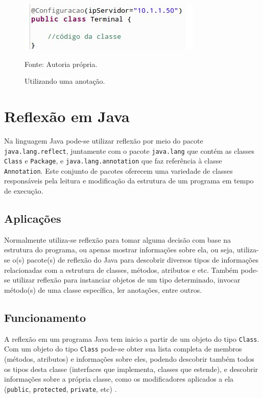 \documentclass[tc,oneside]{iiufrgs}
\begin{document}
\begin{figure}[ht]
	\centering
	\includegraphics[scale=0.6]{figuras/usandoAnnotation.jpg}
	\caption{Utilizando uma anotação.}
	\small{Fonte: Autoria própria.}
	\label{fig:usandoAnotacao}
\end{figure}

\section{Reflexão em Java}
Na linguagem Java pode-se utilizar reflexão por meio do pacote \texttt{java.lang.reflect}, juntamente com o pacote \texttt{java.lang} que contém as classes \texttt{Class} e \texttt{Package}, e \texttt{java.lang.annotation} que faz referência à classe \texttt{Annotation}. Este conjunto de pacotes oferecem uma variedade de classes responsáveis pela leitura e modificação da estrutura de um programa em tempo de execução.


\subsection{Aplicações}

Normalmente utiliza-se reflexão para tomar alguma decisão com base na estrutura do programa, ou apenas mostrar informações sobre ela, ou seja,  utiliza-se o(s) pacote(s) de reflexão do Java para descobrir diversos tipos de informações relacionadas com a estrutura de classes, métodos, atributos e etc. Também pode-se utilizar reflexão para instanciar objetos de um tipo determinado, invocar método(s) de uma classe específica, ler anotações, entre outros.

\subsection{Funcionamento}
A reflexão em um programa Java tem inicio a partir de um objeto do tipo \texttt{Class}. Com um objeto do tipo \texttt{Class} pode-se obter sua lista completa de membros (métodos, atributos) e informações sobre eles, podendo descobrir também todos os tipos desta classe (interfaces que implementa, classes que estende), e descobrir informações sobre a própria classe, como os modificadores aplicados a ela (\texttt{public}, \texttt{protected}, \texttt{private}, etc) \cite{arnold2000java}.
\end{document}
